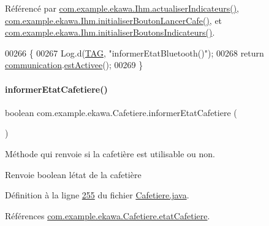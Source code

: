 Référencé par \hyperlink{_ihm_8java_source_l00855}{com.\+example.\+ekawa.\+Ihm.\+actualiser\+Indicateurs()}, \hyperlink{_ihm_8java_source_l00526}{com.\+example.\+ekawa.\+Ihm.\+initialiser\+Bouton\+Lancer\+Cafe()}, et \hyperlink{_ihm_8java_source_l00357}{com.\+example.\+ekawa.\+Ihm.\+initialiser\+Boutons\+Indicateurs()}.


\begin{DoxyCode}
00266     \{
00267         Log.d(\hyperlink{classcom_1_1example_1_1ekawa_1_1_cafetiere_aa0c1fd99a2508b06c462aea17034aa91}{TAG}, \textcolor{stringliteral}{"informerEtatBluetooth()"});
00268         \textcolor{keywordflow}{return} \hyperlink{classcom_1_1example_1_1ekawa_1_1_cafetiere_af9506a7805d000d2cb83444cdb8ea889}{communication}.\hyperlink{classcom_1_1example_1_1ekawa_1_1_communication_a1007662e44cb2d0af3bef6d36246bf9a}{estActivee}();
00269     \}
\end{DoxyCode}
\mbox{\label{classcom_1_1example_1_1ekawa_1_1_cafetiere_a4253a092cf9c84f7b97021e628d5bfb4}} 
\paragraph{\texorpdfstring{informer\+Etat\+Cafetiere()}{informerEtatCafetiere()}}
{\footnotesize\ttfamily boolean com.\+example.\+ekawa.\+Cafetiere.\+informer\+Etat\+Cafetiere (\begin{DoxyParamCaption}{ }\end{DoxyParamCaption})}



Méthode qui renvoie si la cafetière est utilisable ou non. 

\begin{DoxyReturn}{Renvoie}
boolean l\textquotesingle{}état de la cafetière 
\end{DoxyReturn}


Définition à la ligne \hyperlink{_cafetiere_8java_source_l00255}{255} du fichier \hyperlink{_cafetiere_8java_source}{Cafetiere.\+java}.



Références \hyperlink{_cafetiere_8java_source_l00090}{com.\+example.\+ekawa.\+Cafetiere.\+etat\+Cafetiere}.



